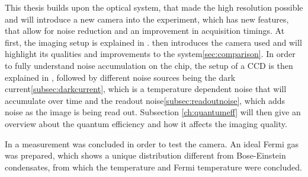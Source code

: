 This thesis builds upon the optical system, that made the high resolution possible and will introduce a new camera into the experiment, which has new features, that allow for noise reduction and an improvement in acquisition timings. At first, the imaging setup is explained in .  then introduces the camera used and will highlight its qualities and improvements to the system\ref{sec:comparison}. In order to fully understand noise accumulation on the chip, the setup of a CCD is then explained in , followed by different noise sources being the dark current\ref{subsec:darkcurrent}, which is a temperature dependent noise that will accumulate over time and the readout noise\ref{subsec:readoutnoise}, which adds noise as the image is being read out.
Subsection \ref{ch:quantumeff} will then give an overview about the quantum efficiency and how it affects the imaging quality.

In  a measurement was concluded in order to test the camera. An ideal Fermi gas was prepared, which shows a unique distribution different from Bose-Einstein condensates, from which the temperature and Fermi temperature were concluded.